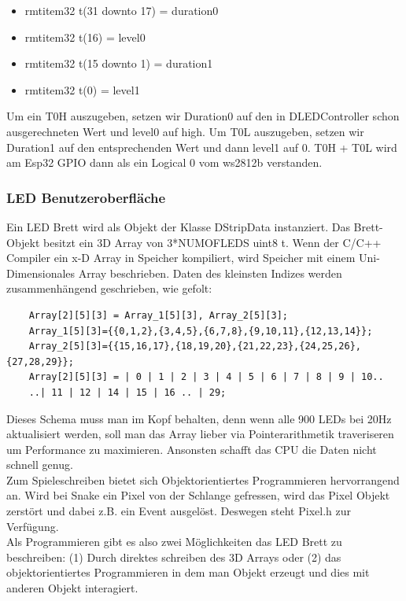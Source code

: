 \documentclass[12pt,a4paper]{article}
\begin{document}
\begin{itemize}
\item rmt\textunderscore item32 \textunderscore t(31 downto 17) = duration0
\item rmt\textunderscore item32 \textunderscore t(16) = level0
\item rmt\textunderscore item32 \textunderscore t(15 downto 1) = duration1
\item rmt\textunderscore item32 \textunderscore t(0) = level1
\end{itemize}

Um ein T0H auszugeben, setzen wir Duration0 auf den in DLEDController schon ausgerechneten Wert und level0 auf high. Um T0L auszugeben, setzen wir Duration1 auf den entsprechenden Wert und dann level1 auf 0. T0H + T0L wird am Esp32 GPIO dann als ein Logical 0 vom ws2812b verstanden. 

\subsubsection{LED Benutzeroberfläche}
Ein LED Brett wird als Objekt der Klasse DStripData instanziert. Das Brett-Objekt besitzt ein 3D Array von 3*NUM\textunderscore OF\textunderscore LEDS uint8 \textunderscore t. Wenn der C/C++ Compiler ein x-D Array in Speicher kompiliert, wird Speicher mit einem Uni-Dimensionales Array beschrieben. Daten des kleinsten Indizes werden zusammenhängend geschrieben, wie gefolt:
	
	\begin{verbatim}
	Array[2][5][3] = Array_1[5][3], Array_2[5][3];
	Array_1[5][3]={{0,1,2},{3,4,5},{6,7,8},{9,10,11},{12,13,14}};
	Array_2[5][3]={{15,16,17},{18,19,20},{21,22,23},{24,25,26},{27,28,29}};
	Array[2][5][3] = | 0 | 1 | 2 | 3 | 4 | 5 | 6 | 7 | 8 | 9 | 10..
	..| 11 | 12 | 14 | 15 | 16 .. | 29;
	\end{verbatim}

Dieses Schema muss man im Kopf behalten, denn wenn alle 900 LEDs bei 20Hz aktualisiert werden, soll man das Array lieber via Pointerarithmetik traveriseren um Performance zu maximieren. Ansonsten schafft das CPU die Daten nicht schnell genug. 
\vspace{1ex}\\
Zum Spieleschreiben bietet sich Objektorientiertes Programmieren hervorrangend an. Wird bei Snake ein Pixel von der Schlange gefressen, wird das Pixel Objekt zerstört und dabei z.B. ein Event ausgelöst. Deswegen steht Pixel.h zur Verfügung.
\vspace{1ex}\\
Als Programmieren gibt es also zwei Möglichkeiten das LED Brett zu beschreiben: (1) Durch direktes schreiben des 3D Arrays oder (2) das objektorientiertes Programmieren in dem man Objekt erzeugt und dies mit anderen Objekt interagiert.
\end{document}
